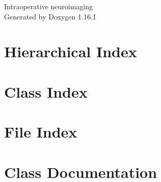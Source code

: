 \documentclass[twoside]{book}
\newcommand{\+}{\discretionary{\mbox{\scriptsize$\hookleftarrow$}}{}{}}
\newcommand{\clearemptydoublepage}{%
    \newpage{\pagestyle{empty}\cleardoublepage}%
  }
\begin{document}
  \raggedbottom
    \hypersetup{pageanchor=false,
                bookmarksnumbered=true,
                pdfencoding=unicode
               }
  \begin{titlepage}
  \vspace*{7cm}
  \begin{center}%
  {\Large Intraoperative neuroimaging}\\
  \vspace*{1cm}
  {\large Generated by Doxygen 1.16.1}\\
  \end{center}
  \end{titlepage}
  \clearemptydoublepage
  \tableofcontents
  \clearemptydoublepage
  \hypersetup{pageanchor=true}

\chapter{Hierarchical Index}

\chapter{Class Index}

\chapter{File Index}

\chapter{Class Documentation}







































\end{document}
